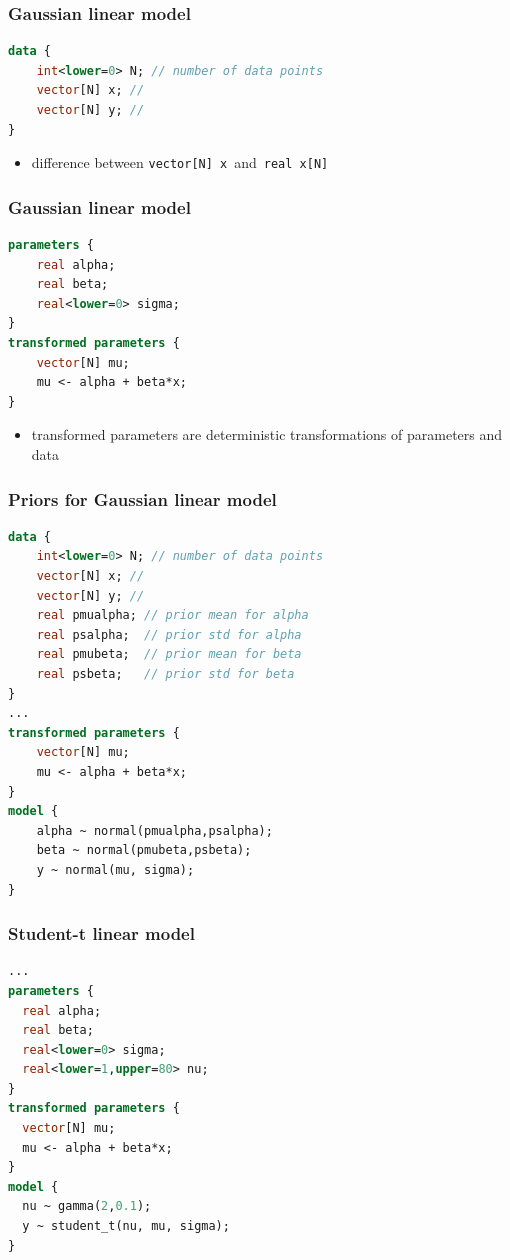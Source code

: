 \documentclass[10pt]{beamer}
\begin{document}
\begin{frame}[fragile]

\frametitle{Gaussian linear model}
  {\small
  \begin{lstlisting}[language=Stan]
data {
    int<lower=0> N; // number of data points
    vector[N] x; //
    vector[N] y; //
}
\end{lstlisting}
  }

  \begin{itemize}
  \item difference between {\tt vector[N] x}\, and\, {\tt real x[N]}
  \end{itemize}
\end{frame}

\begin{frame}[fragile]

\frametitle{Gaussian linear model}
  {\small
  \begin{lstlisting}[language=Stan]
parameters {
    real alpha;
    real beta;
    real<lower=0> sigma;
}
transformed parameters {
    vector[N] mu;
    mu <- alpha + beta*x;
}
\end{lstlisting}
  }
  \begin{itemize}
  \item transformed parameters are deterministic transformations of parameters and data
  \end{itemize}
\end{frame}

\begin{frame}[fragile]

\frametitle{Priors for Gaussian linear model}
  {\small
  \begin{lstlisting}[language=Stan]
data {
    int<lower=0> N; // number of data points
    vector[N] x; //
    vector[N] y; //
    real pmualpha; // prior mean for alpha
    real psalpha;  // prior std for alpha
    real pmubeta;  // prior mean for beta
    real psbeta;   // prior std for beta
}
...
transformed parameters {
    vector[N] mu;
    mu <- alpha + beta*x;
}
model {
    alpha ~ normal(pmualpha,psalpha);
    beta ~ normal(pmubeta,psbeta);
    y ~ normal(mu, sigma);
}
  \end{lstlisting}
}
\end{frame}

\begin{frame}[fragile]

\frametitle{Student-t linear model}
  {\small
  \begin{lstlisting}[language=Stan]
...
parameters {
  real alpha;
  real beta;
  real<lower=0> sigma;
  real<lower=1,upper=80> nu;
}
transformed parameters {
  vector[N] mu;
  mu <- alpha + beta*x;
}
model {
  nu ~ gamma(2,0.1);
  y ~ student_t(nu, mu, sigma);
}
  \end{lstlisting}
}
\end{frame}
\end{document}
